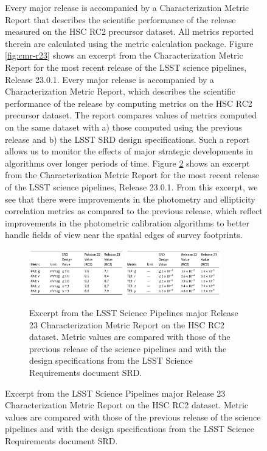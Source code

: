 \begin{figure}[!ht]

Every major release is accompanied by a Characterization Metric Report that describes the scientific performance of the release measured on the HSC RC2 precursor dataset. 
All metrics reported therein are calculated using the \faro metric calculation package. 
Figure \ref{fig:cmr-r23} shows an excerpt from the Characterization Metric Report \cite{dmtr-351} for the most recent release of the LSST science pipelines, Release 23.0.1.
Every major release is accompanied by a Characterization Metric Report, which describes the scientific performance of the release by computing \faro metrics on the HSC RC2 precursor dataset. 
The report compares values of metrics computed on the same dataset with a) those computed using the previous release and b) the LSST SRD design specifications.  
Such a report allows us to monitor the effects of major strategic developments in algorithms over longer periods of time. 
Figure \ref{fig:cmr_r23} shows an excerpt from the Characterization Metric Report \cite{dmtr-351} for the most recent release of the LSST science pipelines, Release 23.0.1.
From this excerpt, we see that there were improvements in the photometry and ellipticity correlation metrics as compared to the previous release, which reflect improvements in the photometric calibration algorithms to better handle fields of view near the spatial edges of survey footprints. 
\begin{figure}[h]
  \centering
  \includegraphics[width=0.45\textwidth]{figures/cmr_r23_photometric_metrics} 
  \hspace{0.5cm}
  \includegraphics[width=0.45\textwidth]{figures/cmr_r23_ellipticity_metrics}
  \par\medskip %
  \caption{Excerpt from the  LSST Science Pipelines major Release 23 Characterization Metric Report on the HSC RC2 dataset. Metric values are compared with those of the previous release of the science pipelines and with the design specifications from the LSST Science Requirements document SRD.}
  \label{fig:cmr_r23}
\end{figure}


\end{figure}
